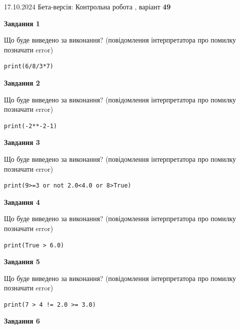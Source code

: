 \documentclass[12pt, ukrainian]{article}
\begin{document}
{\Large{17.10.2024 Бета-версія: Контрольна робота , варіант  \No \textbf { 49 }\par}}
{
\begin {large}
{\begin {center}\textbf{Завдання 1}\end {center}}

Що буде виведено за виконання? (повідомлення інтерпретатора про помилку позначати error)\par
\begin{verbatim}
print(6/8/3*7)
\end{verbatim}

{\begin {center}\textbf{Завдання 2}\end {center}}

Що буде виведено за виконання? (повідомлення інтерпретатора про помилку позначати error)\par
\begin{verbatim}
print(-2**-2-1)
\end{verbatim}

{\begin {center}\textbf{Завдання 3}\end {center}}

Що буде виведено за виконання? (повідомлення інтерпретатора про помилку позначати error)\par
\begin{verbatim}
print(9>=3 or not 2.0<4.0 or 8>True)
\end{verbatim}

{\begin {center}\textbf{Завдання 4}\end {center}}

Що буде виведено за виконання? (повідомлення інтерпретатора про помилку позначати error)\par
\begin{verbatim}
print(True > 6.0)
\end{verbatim}

{\begin {center}\textbf{Завдання 5}\end {center}}

Що буде виведено за виконання? (повідомлення інтерпретатора про помилку позначати error)\par
\begin{verbatim}
print(7 > 4 != 2.0 >= 3.0)
\end{verbatim}

{\begin {center}\textbf{Завдання 6}\end {center}}


\end{large}}
\end{document}
